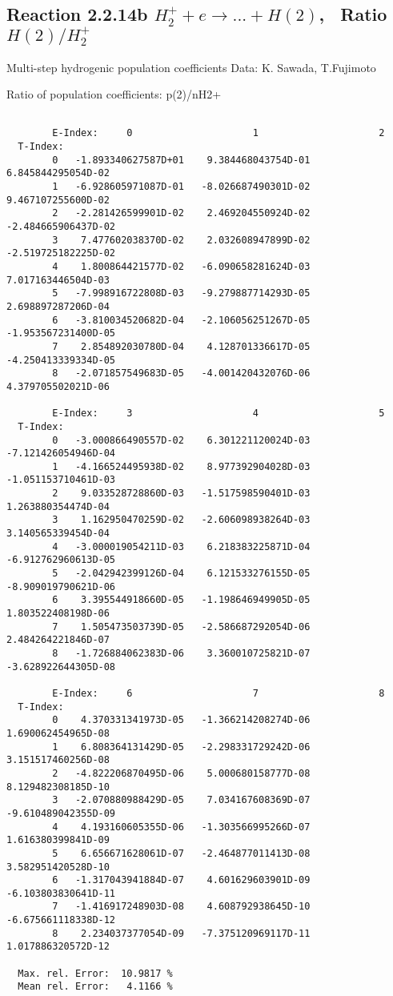 \documentclass[12pt,dvipdfmx]{article}
\begin{document}
\subsection{
Reaction 2.2.14b $ H_2^+ + e \rightarrow ...+ H(2) $, \  Ratio $H(2)/H_2^+  $
}

 Multi-step hydrogenic population coefficients
 Data: K. Sawada, T.Fujimoto \cite{kn:Sawada}

 Ratio of population coefficients: p(2)/nH2+

\begin{small}\begin{verbatim}

        E-Index:     0                     1                     2
  T-Index:
        0   -1.893340627587D+01    9.384468043754D-01    6.845844295054D-02
        1   -6.928605971087D-01   -8.026687490301D-02    9.467107255600D-02
        2   -2.281426599901D-02    2.469204550924D-02   -2.484665906437D-02
        3    7.477602038370D-02    2.032608947899D-02   -2.519725182225D-02
        4    1.800864421577D-02   -6.090658281624D-03    7.017163446504D-03
        5   -7.998916722808D-03   -9.279887714293D-05    2.698897287206D-04
        6   -3.810034520682D-04   -2.106056251267D-05   -1.953567231400D-05
        7    2.854892030780D-04    4.128701336617D-05   -4.250413339334D-05
        8   -2.071857549683D-05   -4.001420432076D-06    4.379705502021D-06

        E-Index:     3                     4                     5
  T-Index:
        0   -3.000866490557D-02    6.301221120024D-03   -7.121426054946D-04
        1   -4.166524495938D-02    8.977392904028D-03   -1.051153710461D-03
        2    9.033528728860D-03   -1.517598590401D-03    1.263880354474D-04
        3    1.162950470259D-02   -2.606098938264D-03    3.140565339454D-04
        4   -3.000019054211D-03    6.218383225871D-04   -6.912762960613D-05
        5   -2.042942399126D-04    6.121533276155D-05   -8.909019790621D-06
        6    3.395544918660D-05   -1.198646949905D-05    1.803522408198D-06
        7    1.505473503739D-05   -2.586687292054D-06    2.484264221846D-07
        8   -1.726884062383D-06    3.360010725821D-07   -3.628922644305D-08

        E-Index:     6                     7                     8
  T-Index:
        0    4.370331341973D-05   -1.366214208274D-06    1.690062454965D-08
        1    6.808364131429D-05   -2.298331729242D-06    3.151517460256D-08
        2   -4.822206870495D-06    5.000680158777D-08    8.129482308185D-10
        3   -2.070880988429D-05    7.034167608369D-07   -9.610489042355D-09
        4    4.193160605355D-06   -1.303566995266D-07    1.616380399841D-09
        5    6.656671628061D-07   -2.464877011413D-08    3.582951420528D-10
        6   -1.317043941884D-07    4.601629603901D-09   -6.103803830641D-11
        7   -1.416917248903D-08    4.608792938645D-10   -6.675661118338D-12
        8    2.234037377054D-09   -7.375120969117D-11    1.017886320572D-12

  Max. rel. Error:  10.9817 %
  Mean rel. Error:   4.1166 %


\end{verbatim}\end{small}
\end{document}

